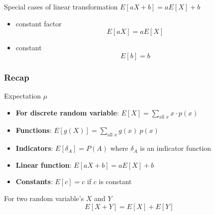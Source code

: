 \documentclass[slidestop,compress,mathserif]{beamer}
\begin{document}

\begin{frame}%
Special cases of linear transformation $ E[aX+b] = a E[X] + b $
\begin{itemize}
\item constant factor \[ E[aX] = a E[X] \]

\vspace{2cm}
\item constant \[ E[b] = b \]
\end{itemize}

\end{frame}


\begin{frame}\frametitle{Recap}

Expectation $\mu$
\begin{itemize}
\item \textbf{For discrete random variable}: $E[X] = \sum_{\text{all } x} x \cdot p(x)$
\item \textbf{Functions}: $E[g(X)] = \sum_{\text{all }x} g(x)~p(x)$
\vspace{2mm}
\item \textbf{Indicators}: $E[\delta_A] = P(A)$ where $\delta_A$ is an indicator function
\item \textbf{Linear function}: $E[aX + b] = aE[X] + b$
\item \textbf{Constants}: $E[c] = c$ if $c$ is constant
\end{itemize}

\pause
For two random variable's $X$ and $Y$
\[E[X + Y] = E[X] + E[Y]\]

\end{frame}


\end{document}

